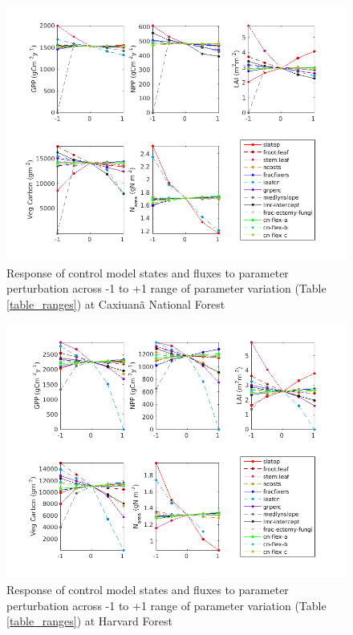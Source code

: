 \documentclass[draft,linenumbers]{agujournal}
\begin{document}
 \begin{figure}[h]
     \includegraphics[width=1.2\textwidth]{matlab/figures/NOVc_STATE_1CLM50defpft_trans_1x1pt_Br-cax_ens_MIC_y1_2012.png}
     \caption{Response of control model states and fluxes to parameter perturbation across -1 to +1 range of parameter variation (Table \ref{table_ranges}) at Caxiuan\~a National Forest}
     \label{CAX state}
  \end{figure}
 
 \begin{figure}[h]
     \includegraphics[width=1.2\textwidth]{matlab/figures/NOVc_STATE_1CLM50defpft_trans_1x1pt_US_Ha1_ens_MIC_y1_2012.png}
     \caption{Response of control model states and fluxes to parameter perturbation across -1 to +1 range of parameter variation (Table \ref{table_ranges}) at Harvard Forest}
     \label{HVF state}
 \end{figure}
 
\end{document}
